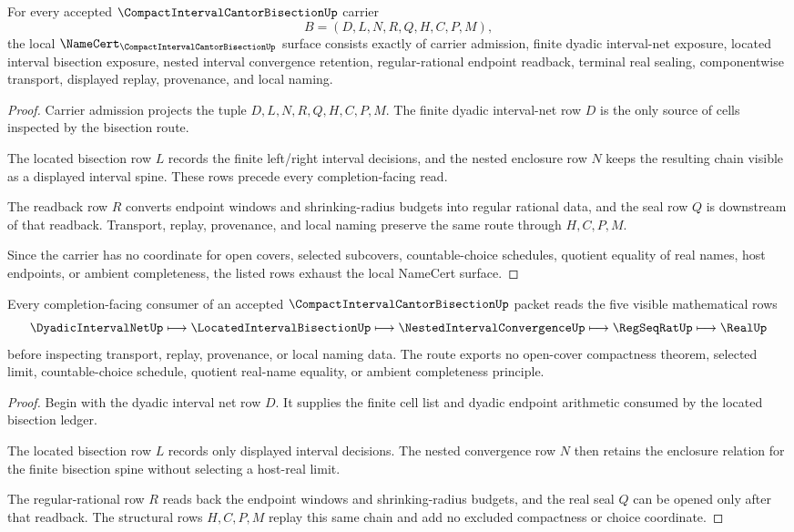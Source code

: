 \begin{theorem}
\label{thm:compact-interval-cantor-bisection-namecert-obligations}
For every accepted $\CompactIntervalCantorBisectionUp$ carrier
$$
B=(D,L,N,R,Q,H,C,P,M),
$$
the local $\NameCert_{\CompactIntervalCantorBisectionUp}$ surface consists exactly of carrier admission, finite dyadic interval-net exposure, located interval bisection exposure, nested interval convergence retention, regular-rational endpoint readback, terminal real sealing, componentwise transport, displayed replay, provenance, and local naming.
\end{theorem}
\begin{proof}
Carrier admission projects the tuple $D,L,N,R,Q,H,C,P,M$. The finite dyadic interval-net row $D$ is the only source of cells inspected by the bisection route.

The located bisection row $L$ records the finite left/right interval decisions, and the nested enclosure row $N$ keeps the resulting chain visible as a displayed interval spine. These rows precede every completion-facing read.

The readback row $R$ converts endpoint windows and shrinking-radius budgets into regular rational data, and the seal row $Q$ is downstream of that readback. Transport, replay, provenance, and local naming preserve the same route through $H,C,P,M$.

Since the carrier has no coordinate for open covers, selected subcovers, countable-choice schedules, quotient equality of real names, host endpoints, or ambient completeness, the listed rows exhaust the local NameCert surface.
\end{proof}

\begin{theorem}
\label{thm:compact-interval-cantor-bisection-five-row-route}
Every completion-facing consumer of an accepted $\CompactIntervalCantorBisectionUp$ packet reads the five visible mathematical rows
$$
\DyadicIntervalNetUp
\longmapsto
\LocatedIntervalBisectionUp
\longmapsto
\NestedIntervalConvergenceUp
\longmapsto
\RegSeqRatUp
\longmapsto
\RealUp
$$
before inspecting transport, replay, provenance, or local naming data. The route exports no open-cover compactness theorem, selected limit, countable-choice schedule, quotient real-name equality, or ambient completeness principle.
\end{theorem}
\begin{proof}
Begin with the dyadic interval net row $D$. It supplies the finite cell list and dyadic endpoint arithmetic consumed by the located bisection ledger.

The located bisection row $L$ records only displayed interval decisions. The nested convergence row $N$ then retains the enclosure relation for the finite bisection spine without selecting a host-real limit.

The regular-rational row $R$ reads back the endpoint windows and shrinking-radius budgets, and the real seal $Q$ can be opened only after that readback. The structural rows $H,C,P,M$ replay this same chain and add no excluded compactness or choice coordinate.
\end{proof}

